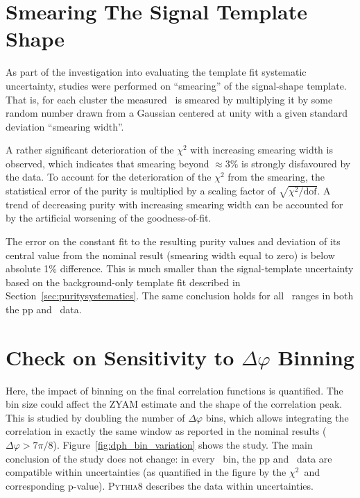 \section{Smearing The Signal Template Shape}
\label{sec:smearingsignaltemplate}
As part of the investigation into evaluating the template fit systematic uncertainty, studies were performed on ``smearing'' of the signal-shape template. That is, for each cluster the measured \lambdasquare~is smeared by multiplying it by some random number drawn from a Gaussian centered at unity with a given standard deviation ``smearing width''.

A rather significant deterioration of the $\chi^{2}$ with increasing smearing width is observed, which indicates that smearing beyond $\approx3\%$ is strongly disfavoured by the data. To account for the deterioration of the $\chi^{2}$ from the smearing, the statistical error of the purity is multiplied by a scaling factor of $\sqrt{\chi^{2}/\mathrm{dof}}$. A trend of decreasing purity with increasing smearing width can be accounted for by the artificial worsening of the goodness-of-fit. 


The error on the constant fit to the resulting purity values and deviation of its central value from the nominal result (smearing width equal to zero) is below absolute 1$\%$ difference. This is much smaller than the signal-template uncertainty based on the background-only template fit described in Section~\ref{sec:puritysystematics}. The same conclusion holds for all \pt~ranges in both the pp and \pPb~data.  


\section{Check on Sensitivity to $\Delta\varphi$ Binning}

Here, the impact of binning on the final correlation functions is quantified. The bin size could affect the ZYAM estimate and the shape of the correlation peak. This is studied by doubling the number of $\Delta\varphi$ bins, which allows integrating the correlation in exactly the same window as reported in the nominal results ($\Delta\varphi>7\pi/8$). Figure~\ref{fig:dph_bin_variation} shows the study. The main conclusion of the study does not change: in every \zt~bin, the pp and \pPb~data are compatible within uncertainties (as quantified in the figure by the $\chi^{2}$~and corresponding p-value). \textsc{Pythia8} describes the data within uncertainties. 

